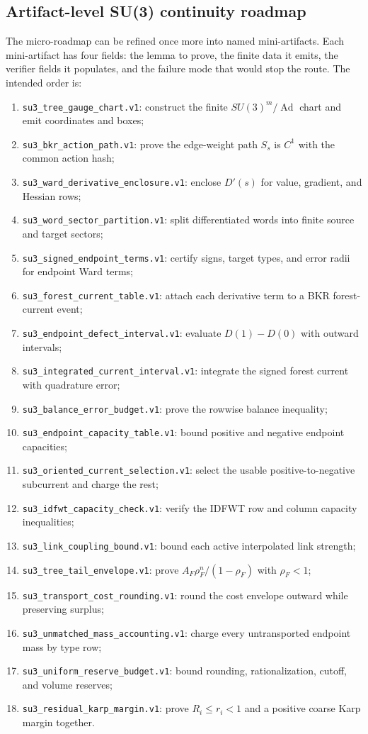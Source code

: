 \subsection{Artifact-level SU(3) continuity roadmap}
The micro-roadmap can be refined once more into named mini-artifacts.  Each
mini-artifact has four fields: the lemma to prove, the finite data it emits,
the verifier fields it populates, and the failure mode that would stop the
route.  The intended order is:
\begingroup\small
\begin{enumerate}
\item \texttt{su3\_tree\_gauge\_chart.v1}: construct the finite
  \(SU(3)^m/\operatorname{Ad}\) chart and emit coordinates and boxes;
\item \texttt{su3\_bkr\_action\_path.v1}: prove the edge-weight path
  \(S_s\) is \(C^1\) with the common action hash;
\item \texttt{su3\_ward\_derivative\_enclosure.v1}: enclose \(D'(s)\) for
  value, gradient, and Hessian rows;
\item \texttt{su3\_word\_sector\_partition.v1}: split differentiated words
  into finite source and target sectors;
\item \texttt{su3\_signed\_endpoint\_terms.v1}: certify signs, target types,
  and error radii for endpoint Ward terms;
\item \texttt{su3\_forest\_current\_table.v1}: attach each derivative term to
  a BKR forest-current event;
\item \texttt{su3\_endpoint\_defect\_interval.v1}: evaluate \(D(1)-D(0)\)
  with outward intervals;
\item \texttt{su3\_integrated\_current\_interval.v1}: integrate the signed
  forest current with quadrature error;
\item \texttt{su3\_balance\_error\_budget.v1}: prove the rowwise balance
  inequality;
\item \texttt{su3\_endpoint\_capacity\_table.v1}: bound positive and negative
  endpoint capacities;
\item \texttt{su3\_oriented\_current\_selection.v1}: select the usable
  positive-to-negative subcurrent and charge the rest;
\item \texttt{su3\_idfwt\_capacity\_check.v1}: verify the IDFWT row and
  column capacity inequalities;
\item \texttt{su3\_link\_coupling\_bound.v1}: bound each active interpolated
  link strength;
\item \texttt{su3\_tree\_tail\_envelope.v1}: prove \(A_F\rho_F^n/(1-\rho_F)\)
  with \(\rho_F<1\);
\item \texttt{su3\_transport\_cost\_rounding.v1}: round the cost envelope
  outward while preserving surplus;
\item \texttt{su3\_unmatched\_mass\_accounting.v1}: charge every
  untransported endpoint mass by type row;
\item \texttt{su3\_uniform\_reserve\_budget.v1}: bound rounding,
  rationalization, cutoff, and volume reserves;
\item \texttt{su3\_residual\_karp\_margin.v1}: prove \(R_i\le r_i<1\) and a
  positive coarse Karp margin together.
\end{enumerate}
